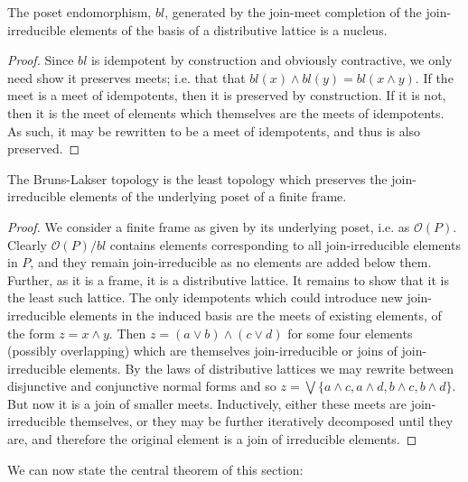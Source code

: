 \documentclass[a4paper,USenglish,cleveref, autoref, thm-restate,authorcolumns]{lipics-v2019}
\newcommand{\Oc}{\mathcal{O}}
\begin{document}
\begin{lemma}
The poset endomorphism, \(bl\), generated by the join-meet completion of the join-irreducible elements of the basis of a distributive lattice is a nucleus.
\end{lemma}
\begin{proof}
Since \(bl\) is idempotent by construction and obviously contractive, we only need show it preserves meets; i.e. that that \(bl(x) \wedge bl(y) = bl(x  \wedge  y)\).  If the meet is a meet of idempotents, then it is preserved by construction. If it is not, then it is the meet of elements which themselves are the meets of idempotents. As such, it may be rewritten to be a meet of idempotents, and thus is also preserved.
\end{proof}


\begin{lemma}
The Bruns-Lakser topology is the least topology which preserves the join-irreducible elements of the underlying poset of a finite frame.
\end{lemma}
\begin{proof}
We consider a finite frame as given by its underlying poset, i.e. as \(\Oc(P)\). Clearly \(\Oc(P)/bl\) contains elements corresponding to all join-irreducible elements in \(P\), and they remain join-irreducible as no elements are added below them. Further, as it is a frame, it is a distributive lattice. It remains to show that it is the least such lattice. The only idempotents which could introduce new join-irreducible elements in the induced basis are the meets of existing elements, of the form  \(z = x \wedge y\). Then \(z = (a \vee b) \wedge (c \vee d)\) for some four elements (possibly overlapping) which are themselves join-irreducible or joins of join-irreducible elements.  By the laws of distributive lattices we may rewrite between disjunctive and conjunctive normal forms and so \(z = \bigvee \{a \wedge c, a \wedge d, b \wedge c, b \wedge d\}\).  But now it is a join of smaller meets. Inductively, either these meets are join-irreducible themselves, or they may be further iteratively decomposed until they are, and therefore the original element is a join of irreducible elements.
\end{proof}

We can now state the central theorem of this section:
\end{document}
